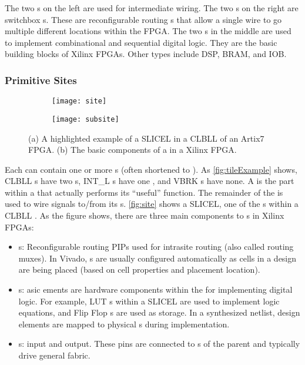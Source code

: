 \noindent
The two  s on the left are used for intermediate wiring.
The two  s on the right are switchbox s.
These are reconfigurable routing s that allow a single wire to go
multiple different locations within the FPGA. The two  s
in the middle are used to implement combinational and sequential digital logic.
They are the basic building blocks of Xilinx FPGAs. Other  types
include DSP, BRAM, and IOB.
 
\subsubsection{Primitive Sites}

\begin{figure}[b!]
\centering
   \begin{subfigure}[b!]{0.65\textwidth}
   \texttt{[image: site]}
   \caption{}
   \label{fig:site1} 
\end{subfigure}

\begin{subfigure}[b!]{0.65\textwidth}
   \texttt{[image: subsite]}
   \caption{}
   \label{fig:site2}
\end{subfigure}

\caption{(a) A highlighted example of a SLICEL  in a CLBLL 
of an Artix7 FPGA. (b) The basic components of a  in a
Xilinx FPGA.}
\label{fig:site}
\end{figure}

Each  can contain one or more s (often shortened
to ). As \autoref{fig:tileExample} shows, CLBLL s
have two s, INT\_L s have one , and VBRK s
have none. A  is the part within a  that actually performs
its ``useful'' function. The remainder of the  is used to wire signals
to/from its s. \autoref{fig:site} shows a SLICEL, one of the
s within a CLBLL . As the figure shows, there are three main
components to s in Xilinx FPGAs:

\begin{itemize}
  \item {} s: Reconfigurable routing PIPs used for intrasite
  routing (also called routing muxes). In Vivado,  s are usually configured
  automatically as cells in a design are being placed (based on cell properties
  and placement location).
  \item {}s: asic ements are hardware components within
  the  for implementing digital logic. For example, LUT s within a SLICEL
  are used to implement logic equations, and Flip Flop s are used
  as storage. In a synthesized netlist, design elements are mapped to physical
  s during implementation.
  \item {}s:  input and output. These pins are connected
  to s of the parent  and typically drive general
  fabric.
\end{itemize}

